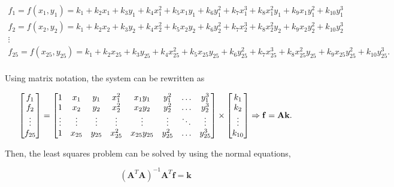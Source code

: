 \documentclass{ipol}
\numberwithin{equation}{section}
\numberwithin{table}{section}
\begin{document}
{\begin{equation*}
	\begin{array}{l}
		f_1 = f(x_1,y_1) = k_1 + k_2x_1 + k_3y_1 + k_4x_1^2 + k_5x_1y_1 + k_6y_1^2 + k_7x_1^3 + k_8x_1^2y_1 + k_9x_1y_1^2 + k_{10}y_1^3 \\
		f_2 = f(x_2,y_2) = k_1 + k_2x_2 + k_3y_2 + k_4x_2^2 + k_5x_2y_2 + k_6y_2^2 + k_7x_2^3 + k_8x_2^2y_2 + k_9x_2y_2^2 + k_{10}y_2^3 \\
		\vdots \\
		f_{25} = f(x_{25},y_{25}) = k_1 + k_2x_{25} + k_3y_{25} + k_4x_{25}^2 + k_5x_{25}y_{25} + k_6y_{25}^2 + k_7x_{25}^3 + k_8x_{25}^2y_{25} + k_9x_{25}y_{25}^2 + k_{10}y_{25}^3 . \\
	\end{array}
\end{equation*}

Using matrix notation, the system can be rewritten as

\begin{equation*}
	\begin{bmatrix} 
		f_1		\\ 
		f_2		\\ 
		\vdots	\\
		f_{25}
	\end{bmatrix} 
	= 
	\begin{bmatrix} 
		1 		& x_1 		& y_1 		& x_1^2 	& x_1y_1 		& y_1^2 	& \hdots 	& y_1^3 	\\
		1 		& x_2 		& y_2 		& x_2^2 	& x_2y_2 		& y_2^2 	& \hdots 	& y_2^3 	\\
		\vdots	& \vdots	& \vdots	& \vdots	& \vdots		& \vdots	& \ddots	& \vdots	\\
		1 		& x_{25}	& y_{25}	& x_{25}^2 	& x_{25}y_{25} 	& y_{25}^2 	& \hdots 	& y_{25}^3
	\end{bmatrix}
	\times
	\begin{bmatrix}
		k_1		\\
		k_2		\\
		\vdots	\\
		k_{10}
	\end{bmatrix}
	\Rightarrow \mathbf{f} = \mathbf{A}\mathbf{k} .\\
\end{equation*}

Then, the least squares problem can be solved by using the normal equations,

\begin{equation*}
	(\mathbf{A}^T\mathbf{A})^{-1}\mathbf{A}^T\mathbf{f} = \mathbf{k} 
\end{equation*}

}
\end{document}
